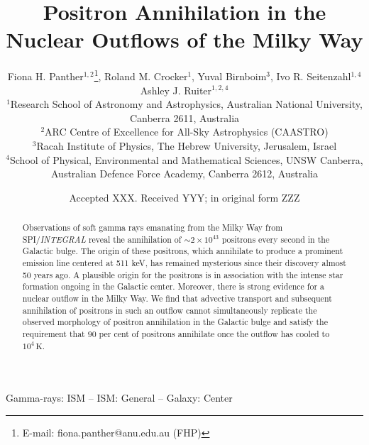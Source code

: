 \documentclass[a4paper,fleqn,usenatbib]{mnras}
\title[Positron annihilation in the nuclear outflows of the MW]{Positron Annihilation in the Nuclear Outflows of the Milky Way}
\author[F. H. Panther et al.]{
Fiona H. Panther$^{1,2}$\thanks{E-mail: fiona.panther@anu.edu.au (FHP)}, Roland M. Crocker$^{1}$, Yuval Birnboim$^{3}$, Ivo R. Seitenzahl$^{1,4}$
\newauthor
Ashley J. Ruiter$^{1,2,4}$
\\
$^{1}$Research School of Astronomy and Astrophysics, Australian National University, Canberra 2611, Australia\\
$^{2}$ARC Centre of Excellence for All-Sky Astrophysics (CAASTRO)\\
$^{3}$Racah Institute of Physics, The Hebrew University, Jerusalem, Israel\\
$^{4}$School of Physical, Environmental and Mathematical Sciences, UNSW Canberra, Australian Defence Force Academy, Canberra 2612, Australia 
}
\date{Accepted XXX. Received YYY; in original form ZZZ}
\begin{document}
\label{firstpage}
\pagerange{\pageref{firstpage}--\pageref{lastpage}}
\maketitle

\begin{abstract} 
Observations of soft gamma rays emanating from the Milky Way from SPI/\textit{INTEGRAL} reveal the annihilation of $\sim2\times10^{43}$ positrons every second in the Galactic bulge. The origin of these positrons, which annihilate to produce a prominent emission line centered at 511 keV, has remained mysterious since their discovery almost 50 years ago. A plausible origin for the positrons is in association with the intense star formation ongoing in the Galactic center. Moreover, there is strong evidence for a nuclear outflow in the Milky Way. We find that advective transport and subsequent annihilation of positrons in such an outflow cannot simultaneously replicate the observed morphology of positron annihilation in the Galactic bulge and satisfy the requirement that $90$ per cent of positrons annihilate once the outflow has cooled to $10^4\,\mathrm{K}$.
\end{abstract}

\begin{keywords}
Gamma-rays: ISM -- ISM: General -- Galaxy: Center 
\end{keywords}


\end{document}
